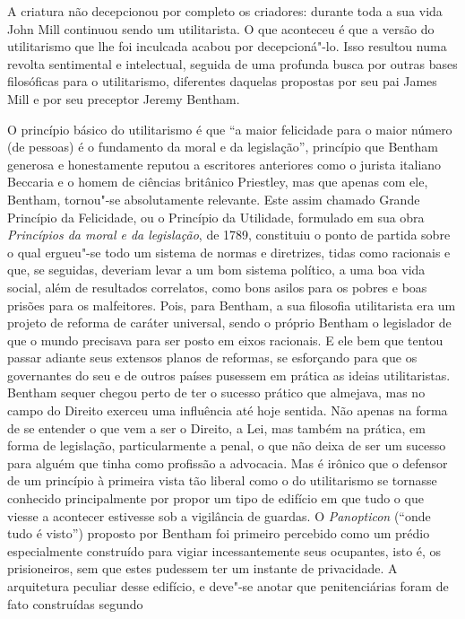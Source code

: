 A criatura não decepcionou por completo os criadores: durante toda a sua
vida John Mill continuou sendo um utilitarista. O que aconteceu é que a
versão do utilitarismo que lhe foi inculcada acabou por
decepcioná"-lo. Isso resultou numa revolta sentimental e intelectual,
seguida de uma profunda busca por outras bases filosóficas para o
utilitarismo, diferentes daquelas propostas por seu pai James Mill e
por seu preceptor Jeremy Bentham. 

O princípio básico do utilitarismo é que ``a maior felicidade para
o maior número (de pessoas) é o fundamento da moral e da legislação'',
princípio que Bentham generosa e honestamente reputou a escritores
anteriores como o jurista italiano Beccaria e o homem de ciências
britânico Priestley, mas que apenas com ele, Bentham, tornou"-se
absolutamente relevante. Este assim chamado Grande Princípio da
Felicidade, ou o Princípio da Utilidade, formulado em sua obra
\textit{Princípios da moral e da legislação}, de 1789, constituiu o
ponto de partida sobre o qual ergueu"-se todo um sistema de normas e
diretrizes, tidas como racionais e que, se seguidas, deveriam levar a
um bom sistema político, a uma boa vida social, além de resultados
correlatos, como bons asilos para os pobres e boas prisões para os
malfeitores. Pois, para Bentham, a sua filosofia utilitarista era um
projeto de reforma de caráter universal, sendo o próprio Bentham o
legislador de que o mundo precisava para ser posto em eixos racionais.
E ele bem que tentou passar adiante seus extensos planos de reformas,
se esforçando para que os governantes do seu e de outros países
pusessem em prática as ideias utilitaristas. Bentham sequer chegou
perto de ter o sucesso prático que almejava, mas no campo do Direito
exerceu uma influência até hoje sentida. Não apenas na forma de se
entender o que vem a ser o Direito, a Lei, mas também na prática, em
forma de legislação, particularmente a penal, o que não deixa de ser um
sucesso para alguém que tinha como profissão a advocacia. Mas é
irônico que o defensor de um princípio à primeira vista tão
liberal como o do utilitarismo se tornasse conhecido principalmente por
propor um tipo de edifício em que tudo o que viesse a acontecer
estivesse sob a vigilância de guardas. O \textit{Panopticon} (``onde
tudo é visto'') proposto por Bentham foi primeiro percebido como um
prédio especialmente construído para vigiar incessantemente seus
ocupantes, isto é, os prisioneiros, sem que estes pudessem ter um
instante de privacidade. A arquitetura peculiar desse edifício, e
deve"-se anotar que penitenciárias foram de fato construídas segundo
